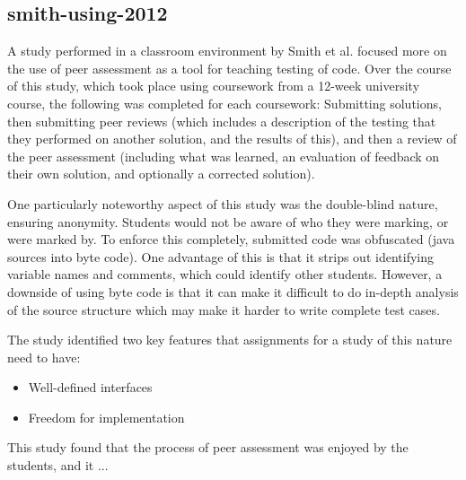 \documentclass[a4paper,11pt]{report}
\begin{document}
\subsection{smith-using-2012}
A study performed in a classroom environment by Smith et al.\cite{smith_using_2012} focused more on the use of peer assessment as a tool for teaching testing of code. Over the course of this study, which took place using coursework from a 12-week university course, the following was completed for each coursework: Submitting solutions, then submitting peer reviews (which includes a description of the testing that they performed on another solution, and the results of this), and then a review of the peer assessment (including what was learned, an evaluation of feedback on their own solution, and optionally a corrected solution).\par
One particularly noteworthy aspect of this study was the double-blind nature, ensuring anonymity. Students would not be aware of who they were marking, or were marked by. To enforce this completely, submitted code was obfuscated (java sources into byte code). One advantage of this is that it strips out identifying variable names and comments, which could identify other students. However, a downside of using byte code is that it can make it difficult to do in-depth analysis of the source structure which may make it harder to write complete test cases.\par %
The study identified two key features that assignments for a study of this nature need to have:
\begin{itemize}
 \item Well-defined interfaces
 \item Freedom for implementation
\end{itemize}
This study found that the process of peer assessment was enjoyed by the students, and it ... %
\end{document}

